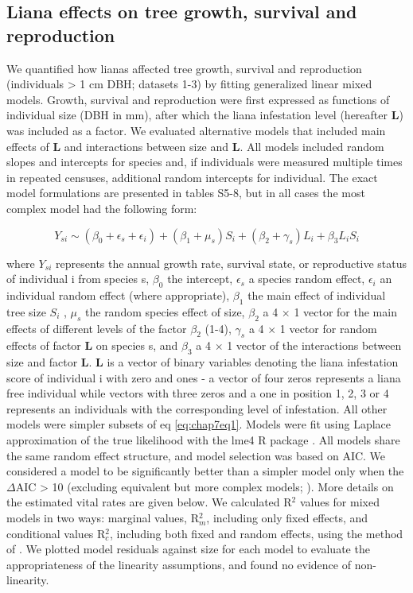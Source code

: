 \documentclass[b5paper,justified]{tufte-book} %
\begin{document}
\begin{fullwidth}
\subsection{Liana effects on tree growth, survival and reproduction}
We quantified how lianas affected tree growth, survival and reproduction (individuals > 1 cm DBH; datasets 1-3) by fitting generalized linear mixed models. Growth, survival and reproduction were first expressed as functions of individual size (DBH in mm), after which the liana infestation level (hereafter \textbf{L}) was included as a factor. We evaluated alternative models that included main effects of \textbf{L} and interactions between size and \textbf{L}. All models included random slopes and intercepts for species and, if individuals were measured multiple times in repeated censuses, additional random intercepts for individual. The exact model formulations are presented in tables S5-8, but in all cases the most complex model had the following form: 

\begin{equation}
Y_{si} \sim (\beta_0 + \epsilon_s  + \epsilon_i )+(\beta_1+ \mu_s)S_i + (\beta_2 +\gamma_s)L_i + \beta_3 L_i S_i    
\label{eq:chap7eq1}
\end{equation}

where $Y_{si}$ represents the annual growth rate, survival state, or reproductive status of individual i from species s, $\beta_0$ the intercept, $\epsilon_s$ a species random effect, $\epsilon_i$ an individual random effect (where appropriate), $\beta_1$ the main effect of individual tree size $S_i$ , $\mu_s$ the random species effect of size, \textbf{$\beta_2$} a 4 $\times$ 1 vector for the main effects of different levels of the factor $\beta_2$ (1-4), $\gamma_s$ a 4 $\times$ 1 vector for random effects of factor \textbf{L} on species s, and $\beta_3$ a 4 $\times$ 1 vector of the interactions between size and factor \textbf{L}. \textbf{L} is a vector of binary variables denoting the liana infestation score of individual i with zero and ones - a vector of four zeros represents a liana free individual while vectors with three zeros and a one in position 1, 2, 3 or 4 represents an individuals with the corresponding level of infestation. All other models were simpler subsets of eq \ref{eq:chap7eq1}. Models were fit using Laplace approximation of the true likelihood with the lme4 R package \citep{Bates2014}. All models share the same random effect structure, and model selection was based on AIC. We considered a model to be significantly better than a simpler model only when the $\Delta$AIC > 10 (excluding equivalent but more complex models; \citealt{Bolker2009}). More details on the estimated vital rates are given below. We calculated R$^2$ values for mixed models in two ways: marginal values, R$^2_m$, including only fixed effects, and conditional values R$^2_c$, including both fixed and random effects, using the method of \citet{Nakagawa2013}. We plotted model residuals against size for each model to evaluate the appropriateness of the linearity assumptions, and found no evidence of non-linearity. 


\end{fullwidth}
\end{document}
